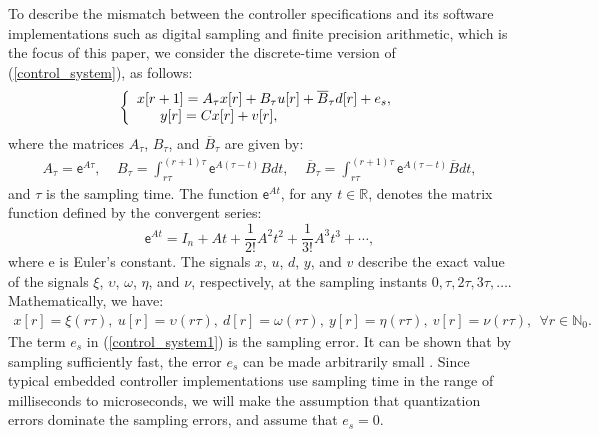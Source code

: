 \documentclass{amsart}
\numberwithin{equation}{section}
\newcommand{\R}{{\mathbb{R}}}
\newcommand{\N}{{\mathbb{N}}}
\begin{document}
To describe the mismatch between the controller specifications and its software implementations 
such as digital sampling and finite precision arithmetic, which is the focus of this paper, 
we consider the discrete-time version of (\ref{control_system}), as follows:
\begin{equation}
\label{control_system1}
\left\{\begin{array}{l}x[r+1]=A_\tau x[r]+B_\tau u[r]+\overline{B}_\tau d[r]+e_s,\\
\hspace{5.8mm}y[r]=Cx[r]+v[r],\end{array}\right.
\end{equation}
where the matrices $A_\tau$, $B_\tau$, and $\overline{B}_\tau$ are given by:
\begin{align}\nonumber
A_\tau=\textsf{e}^{A\tau},~~~~~B_\tau=\int_{r\tau}^{(r+1)\tau}\textsf{e}^{A(\tau-t)}Bdt,~~~~~\overline{B}_\tau=\int_{r\tau}^{(r+1)\tau}\textsf{e}^{A(\tau-t)}\overline{B}dt,
\end{align}
and $\tau$ is the sampling time. The function $\textsf{e}^{At}$, for any $t\in\R$, denotes the matrix function defined by the convergent series:
\begin{equation}\nonumber
\textsf{e}^{At}=I_{n}+At+\frac{1}{2!}A^2t^2+\frac{1}{3!}A^3t^3+\cdots,
\end{equation}
where \textsf{e} is Euler's constant. The signals $x$, $u$, $d$, $y$, and $v$ describe the exact value of the signals $\xi$, $\upsilon$, $\omega$, $\eta$, and $\nu$, respectively, at the sampling instants $0,\tau,2\tau,3\tau,\ldots$. Mathematically, we have:
\begin{align}\nonumber
x[r]=\xi(r\tau),~u[r]=\upsilon(r\tau),~d[r]=\omega(r\tau),~y[r]=\eta(r\tau),~v[r]=\nu(r\tau),~~\forall{r}\in\N_0.
\end{align}
The term $e_s$ in (\ref{control_system1}) is the sampling error. It can be shown that by sampling sufficiently fast, the error $e_s$ can be made arbitrarily small \cite{chen}. 
Since typical embedded controller implementations use sampling time in the range of milliseconds to microseconds, we will 
make the assumption that quantization errors dominate the sampling errors, and 
assume that $e_s=0$. 
 
\end{document}
